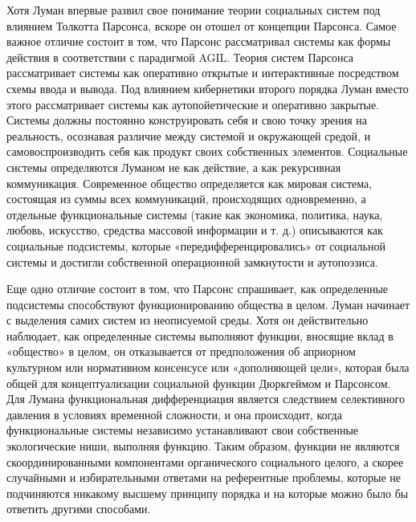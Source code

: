 \documentclass[a4page]{article}
\begin{document}
Хотя Луман впервые развил свое понимание теории социальных систем под влиянием Толкотта Парсонса, вскоре он отошел от концепции Парсонса. Самое важное отличие состоит в том, что Парсонс рассматривал системы как формы действия в соответствии с парадигмой AGIL. Теория систем Парсонса рассматривает системы как оперативно открытые и интерактивные посредством схемы ввода и вывода. Под влиянием кибернетики второго порядка Луман вместо этого рассматривает системы как аутопойетические и оперативно закрытые\cite{social_systems}. Системы должны постоянно конструировать себя и свою точку зрения на реальность, осознавая различие между системой и окружающей средой, и самовоспроизводить себя как продукт своих собственных элементов. Социальные системы определяются Луманом не как действие, а как рекурсивная коммуникация. Современное общество определяется как мировая система, состоящая из суммы всех коммуникаций, происходящих одновременно, а отдельные функциональные системы (такие как экономика, политика, наука, любовь, искусство, средства массовой информации и т. д.) описываются как социальные подсистемы, которые «передифференцировались» от социальной системы и достигли собственной операционной замкнутости и аутопоэзиса\cite{theory_of_society_2}.

Еще одно отличие состоит в том, что Парсонс спрашивает, как определенные подсистемы способствуют функционированию общества в целом. Луман начинает с выделения самих систем из неописуемой среды. Хотя он действительно наблюдает, как определенные системы выполняют функции, вносящие вклад в «общество» в целом, он отказывается от предположения об априорном культурном или нормативном консенсусе или «дополняющей цели», которая была общей для концептуализации социальной функции Дюркгеймом и Парсонсом\cite{theory_of_society_1}. Для Лумана функциональная дифференциация является следствием селективного давления в условиях временной сложности, и она происходит, когда функциональные системы независимо устанавливают свои собственные экологические ниши, выполняя функцию. Таким образом, функции не являются скоординированными компонентами органического социального целого, а скорее случайными и избирательными ответами на референтные проблемы, которые не подчиняются никакому высшему принципу порядка и на которые можно было бы ответить другими способами.
\end{document}
